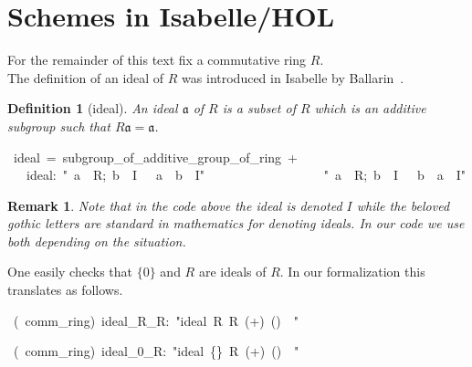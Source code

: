 \documentclass[12pt]{scrartcl}
\newtheorem{definition}[proposition]{Definition}
\newtheorem*{rem}{Remark}
\begin{document}
\section{Schemes in Isabelle/HOL}
\label{sec:schemes}

For the remainder of this text fix a commutative ring $R$. \\
The definition of an ideal of $R$ was introduced in Isabelle  by Ballarin~\cite{ballarin-exploring}.

\begin{definition}[ideal]
	An ideal $\mathfrak{a}$ of $R$ is a subset of $R$ which is an additive subgroup such that $R\mathfrak{a} = \mathfrak{a}$.
\end{definition}


\begin{isabelle}
\ ideal\ =\ subgroup\_of\_additive\_group\_of\_ring\ +\isanewline
\ \ \ ideal:\ "\isasymlbrakk \ a\ \isasymin \ R;\ b\ \isasymin \ I\ \isasymrbrakk \ \isasymLongrightarrow \ a\ \isasymcdot \ b\ \isasymin \ I"\ \isanewline
\ \ \ \ \ \ \ \ \ \ \ \ \ \ \ \ \ "\isasymlbrakk \ a\ \isasymin \ R;\ b\ \isasymin \ I\ \isasymrbrakk \ \isasymLongrightarrow \ b\ \isasymcdot \ a\ \isasymin \ I"
\end{isabelle}

\begin{rem}
	Note that in the code above the ideal is denoted $I$ while the beloved gothic letters are standard in mathematics for denoting ideals. In our code we use both depending on the situation.
\end{rem}	

One easily checks that $\lbrace 0 \rbrace$ and $R$ are ideals of $R$. In our formalization this translates as follows.


\begin{isabelle}
\ (\ comm\_ring)\ ideal\_R\_R:\ "ideal\ R\ R\ (+)\ (\isasymcdot )\ \isasymzero \ \isasymone "
\end{isabelle}

\begin{isabelle}
\ (\ comm\_ring)\ ideal\_0\_R:\ "ideal\ \{\isasymzero \}\ R\ (+)\ (\isasymcdot )\ \isasymzero \ \isasymone "
\end{isabelle}
\end{document}
